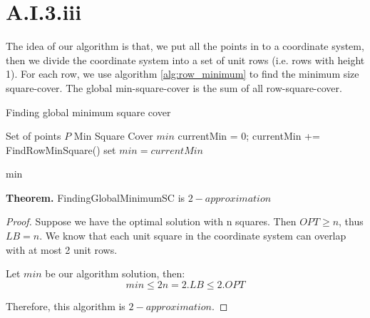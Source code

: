 \section{A.I.3.iii}
\label{a-1-3-3}

The idea of our algorithm is that, we put all the points in to a coordinate system, then we divide the coordinate system into a set of unit rows (i.e. rows with height 1). For each row, we use algorithm \ref{alg:row_minimum} to find the minimum size square-cover. The global min-square-cover is the sum of all row-square-cover.

\begin{algorithm}
  \caption{Finding global minimum square cover}
  \label{alg:global_minimum}
  \begin{algorithmic}
    \renewcommand{\algorithmicrequire}{\textbf{Input:}}
    \renewcommand{\algorithmicensure}{\textbf{Output:}}
    \algnewcommand{}
    \algnewcommand\Operation{\item[\algorithmicoperation]}
    \Require Set of points $P$
    \Ensure Min Square Cover $min$
    \Operation
    \State currentMin = 0;
    \State currentMin += FindRowMinSquare()
    \EndFor
    \State set $min = currentMin$
    
    \Return min
  \end{algorithmic}
\end{algorithm}

\textbf{Theorem.} FindingGlobalMinimumSC is $2-approximation$

\begin{proof}
  Suppose we have the optimal solution with n squares. Then $OPT \geq n$, thus $LB = n$.
  We know that each unit square in the coordinate system can overlap with at most 2 unit rows.

  Let $min$ be our algorithm solution, then:
  \begin {equation}
    min \leq 2n = 2.LB \leq 2.OPT
  \end {equation}

  Therefore, this algorithm is $2-approximation$.

\end{proof}
